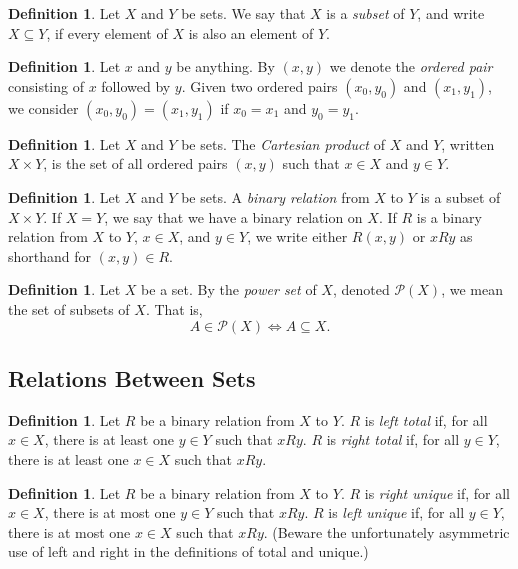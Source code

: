 \documentclass[letterpaper]{article}
\theoremstyle{definition}
\newtheorem{definition}[theorem]{Definition}
\newcommand{\defterm}{\emph}
\renewcommand{\subset}{\subseteq}
\newcommand{\powerset}{\mathcal{P}}
\newcommand{\cartesianprod}{\times}
\begin{document}
\begin{definition}
  Let \(X\) and \(Y\) be sets.  We say that \(X\) is a
  \defterm{subset} of \(Y\), and write \(X \subset Y\), if every
  element of \(X\) is also an element of \(Y\).
\end{definition}

\begin{definition}
  Let \(x\) and \(y\) be anything.  By \((x,y)\) we denote the
  \defterm{ordered pair} consisting of \(x\) followed by \(y\).  Given
  two ordered pairs \((x_0,y_0)\) and \((x_1,y_1)\), we consider
  \((x_0,y_0) = (x_1,y_1)\) if \(x_0 = x_1\) and \(y_0 = y_1\).
\end{definition}

\begin{definition}
  Let \(X\) and \(Y\) be sets.  The \defterm{Cartesian product} of
  \(X\) and \(Y\), written \(X \cartesianprod Y\), is the set of all
  ordered pairs \((x,y)\) such that \(x \in X\) and \(y \in Y\).
\end{definition}

\begin{definition}
  Let \(X\) and \(Y\) be sets.  A \defterm{binary relation} from \(X\)
  to \(Y\) is a subset of \(X \cartesianprod Y\).  If \(X = Y\), we
  say that we have a binary relation on \(X\).  If \(R\) is a binary
  relation from \(X\) to \(Y\), \(x \in X\), and \(y \in Y\), we write
  either \(R(x,y)\) or \(xRy\) as shorthand for \((x,y) \in R\).
\end{definition}

\begin{definition}
  Let \(X\) be a set.  By the \defterm{power set} of \(X\), denoted
  \(\powerset(X)\), we mean the set of subsets of \(X\).  That is,
  \[A \in \powerset(X) \iff A \subset X \text{.}\]
\end{definition}

\subsection{Relations Between Sets}
\begin{definition}
  Let \(R\) be a binary relation from \(X\) to \(Y\).  \(R\) is
  \defterm{left total} if, for all \(x \in X\), there is at least one
  \(y \in Y\) such that \(xRy\).  \(R\) is \defterm{right total} if,
  for all \(y \in Y\), there is at least one \(x \in X\) such that
  \(xRy\).
\end{definition}

\begin{definition}
  Let \(R\) be a binary relation from \(X\) to \(Y\).  \(R\) is
  \defterm{right unique} if, for all \(x \in X\), there is at most one
  \(y \in Y\) such that \(xRy\).  \(R\) is \defterm{left unique} if,
  for all \(y \in Y\), there is at most one \(x \in X\) such that
  \(xRy\).  (Beware the unfortunately asymmetric use of left and right
  in the definitions of total and unique.)
\end{definition}
\end{document}
